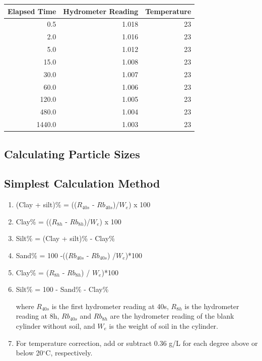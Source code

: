 \documentclass{tufte-handout}
\begin{document}
\begin{table}[ht]
\centering
\begin{tabular}{rrr}
  \hline
Elapsed Time & Hydrometer Reading & Temperature \\ 
  \hline
0.5 & 1.018 & 23 \\ 
  2.0 & 1.016 & 23 \\ 
  5.0 & 1.012 & 23 \\ 
  15.0 & 1.008 & 23 \\ 
  30.0 & 1.007 & 23 \\ 
  60.0 & 1.006 & 23 \\ 
  120.0 & 1.005 & 23 \\ 
  480.0 & 1.004 & 23 \\ 
  1440.0 & 1.003 & 23 \\ 
   \hline
\end{tabular}
\end{table}
\subsection{Calculating Particle Sizes}

\subsection{Simplest Calculation Method}

\begin{enumerate}
	\item (Clay + silt)\% = (($R_{40s}$ - $Rb_{40s}$)/$W_e$) x 100 
	\item Clay\% = (($R_{8h}$ - $Rb_{8h}$)/$W_e$) x 100 
	\item Silt\% = (Clay + silt)\% - Clay\%

	\item Sand\% = 100 -(($Rb_{40s}$ - $Rb_{40s}$) /$W_e$)*100
	\item Clay\% = ($R_{8h}$ - $Rb_{8h}$) / $W_e$)*100
	\item Silt\% = 100 - Sand\% - Clay\%

\noindent where $R_{40s}$ is the first hydrometer reading at 40s, 
$R_{8h}$ is the hydrometer reading at 8h,
$Rb_{40s}$ and $Rb_{8h}$ are the hydrometer reading of the blank cylinder without soil, and $W_e$ is the weight of soil in the cylinder.

	\item For temperature correction, add or subtract 0.36 g/L for each degree above or below 20$^\circ$C, respectively.
\end{enumerate}
\end{document}
